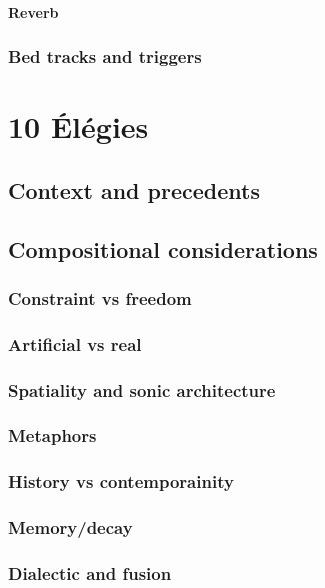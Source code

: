 \documentclass[12pt,twoside,maitrise]{dms}
\theoremstyle{definition}
\begin{document}
\subsubsection{Reverb}

\subsection{Bed tracks and triggers}

\chapter{10 Élégies}

\section{Context and precedents}

\section{Compositional considerations}

\subsection{Constraint vs freedom}

\subsection{Artificial vs real}

\subsection{Spatiality and sonic architecture}

\subsection{Metaphors}

\subsection{History vs contemporainity}

\subsection{Memory/decay}

\subsection{Dialectic and fusion}
\end{document}
